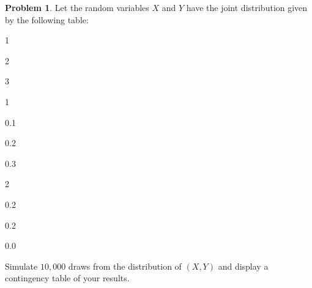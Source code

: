 \documentclass[
]{book}
\theoremstyle{definition}
\theoremstyle{definition}
\theoremstyle{definition}
\newtheorem{exercise}{Problem}[chapter]
\theoremstyle{definition}
\theoremstyle{remark}
\begin{document}
\begin{exercise}
Let the random variables \(X\) and \(Y\) have the joint distribution given by
the following table:

1

2

3

1

0.1

0.2

0.3

2

0.2

0.2

0.0

Simulate \(10,000\) draws from the distribution of \((X,Y)\) and display a
contingency table of your results.
\end{exercise}
\end{document}
